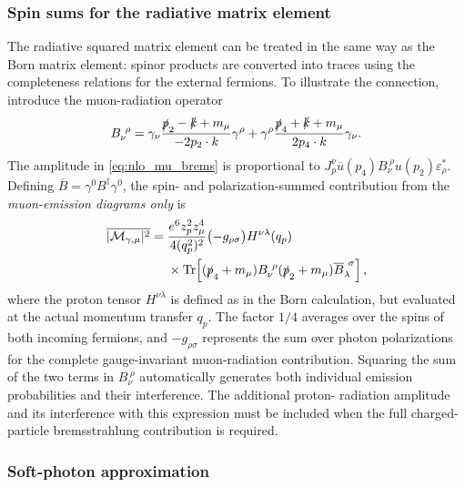 \subsubsection{Spin sums for the radiative matrix element}

The radiative squared matrix element can be treated in the same way as the
Born matrix element: spinor products are converted into traces using the
completeness relations for the external fermions. To illustrate the
connection, introduce the muon-radiation operator
\begin{equation}
 B_\nu^{\ \rho}=
 \gamma_\nu\frac{\slashed p_2-\slashed k+m_\mu}{-2p_2\cdot k}\gamma^\rho
 +\gamma^\rho\frac{\slashed p_4+\slashed k+m_\mu}{2p_4\cdot k}\gamma_\nu.
 \label{eq:nlo_B_operator}
\end{equation}
The amplitude in \autoref{eq:nlo_mu_brems} is proportional to
$J_p^\nu\overline u(p_4)B_\nu^{\ \rho}u(p_2)\varepsilon^*_{\rho}$.
Defining $\overline B=\gamma^0B^\dagger\gamma^0$, the spin- and
polarization-summed contribution from the \emph{muon-emission diagrams only}
is
\begin{align}
 \overline{|\mathcal M_{\gamma,\mu}|^2}={}&
 \frac{e^6z_p^2z_\mu^4}{4(q_p^2)^2}
 \bigl(-g_{\rho\sigma}\bigr)
 H^{\nu\lambda}(q_p)
 \nonumber\\
 &\times \operatorname{Tr}\!\left[
    (\slashed p_4+m_\mu)B_\nu^{\ \rho}
    (\slashed p_2+m_\mu)\overline B_\lambda^{\ \sigma}
    \right],
 \label{eq:nlo_brems_trace}
\end{align}
where the proton tensor $H^{\nu\lambda}$ is defined as in the
Born calculation, but evaluated at the actual momentum transfer $q_p$.
The factor $1/4$ averages over the spins of both incoming fermions, and
$-g_{\rho\sigma}$ represents the sum over photon polarizations for the
complete gauge-invariant muon-radiation contribution. Squaring the sum of
the two terms in $B_\nu^{\ \rho}$ automatically generates both individual
emission probabilities and their interference. The additional proton-
radiation amplitude and its interference with this expression must be included
when the full charged-particle bremsstrahlung contribution is required.

\subsubsection{Soft-photon approximation}

